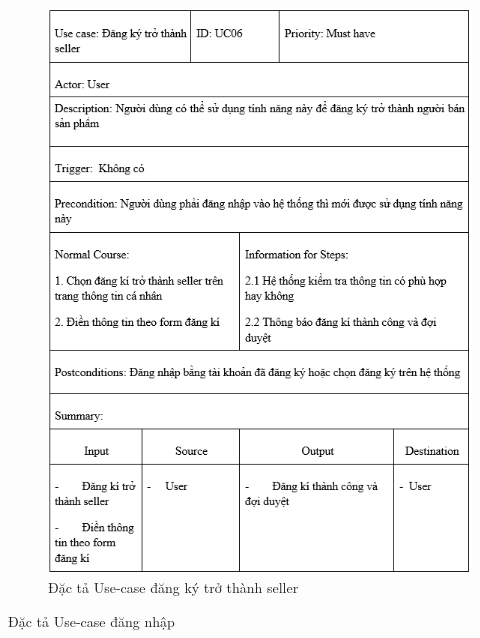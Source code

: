 \documentclass{article}
\begin{document}
{{{{{{	\begin{center}
		\begin{figure}[htp]
			\begin{center}
				\includegraphics[scale=.850]{anh16.png}
			\end{center}
			\caption{Đặc tả Use-case đăng ký trở thành seller}
			
		\end{figure}
	\end{center}
\newpage
{\large Đặc tả Use-case đăng nhập
	
}}}}}}}
\end{document}
